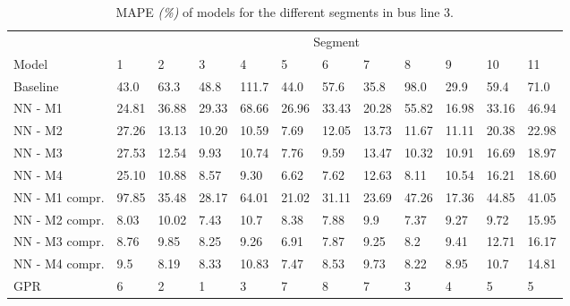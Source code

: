 \begin{table}[H]
  \centering
  \caption{MAPE \textit{(\%)} of models for the different segments in bus line 3.}
  \label{fig:model-mape-of-segs-203}
  \begin{adjustbox}{center}
\begin{tabular}{ l | l | l | l | l | l | l | l | l | l | l | l }
	& \multicolumn{11}{c}{Segment} \\
	Model       & 1 & 2 & 3 & 4 & 5 & 6 & 7 & 8 & 9 & 10 & 11 \\
	\hline
	Baseline  & 43.0 & 63.3 & 48.8 & 111.7 & 44.0 & 57.6 & 35.8 & 98.0 & 29.9 & 59.4  & 71.0 \\
	NN - M1         & 24.81& 36.88& 29.33& 68.66& 26.96& 33.43& 20.28& 55.82& 16.98& 33.16& 46.94 \\
    	NN - M2         & 27.26 & 13.13 & 10.20 & 10.59 &  7.69 & 12.05 &  13.73 & 11.67 & 11.11 & 20.38  & 22.98\\
    	NN - M3         & 27.53 & 12.54 & 9.93 & 10.74 &  7.76 & 9.59 &  13.47 & 10.32 & 10.91 & 16.69  & 18.97\\
    	NN - M4         & 25.10 & 10.88 & 8.57 & 9.30 &  6.62 & 7.62 &  12.63 & 8.11 & 10.54 & 16.21  & 18.60\\
    	NN - M1 compr.         & 97.85& 35.48& 28.17& 64.01& 21.02& 31.11& 23.69& 47.26& 17.36& 44.85& 41.05 \\ 
    	NN - M2 compr.         & 8.03& 10.02& 7.43& 10.7& 8.38& 7.88& 9.9& 7.37& 9.27& 9.72& 15.95 \\
    	NN - M3 compr.         & 8.76& 9.85& 8.25& 9.26& 6.91& 7.87& 9.25& 8.2& 9.41& 12.71& 16.17 \\
    	NN - M4 compr.         & 9.5& 8.19& 8.33& 10.83& 7.47& 8.53& 9.73& 8.22& 8.95& 10.7& 14.81 \\
	GPR         & 6 & 2 & 1 & 3 &  7 & 8 &  7 & 3 & 4 & 5  & 5 \\
\end{tabular}
\end{adjustbox}
\end{table}


